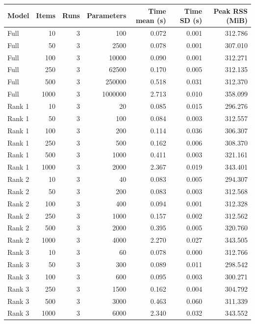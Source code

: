 \begin{tabular}{lrrrrrr}
\toprule
Model & Items & Runs & Parameters & Time mean (s) & Time SD (s) & Peak RSS (MiB) \\
\midrule
Full & 10 & 3 & 100 & 0.072 & 0.001 & 312.786 \\
Full & 50 & 3 & 2500 & 0.078 & 0.001 & 307.010 \\
Full & 100 & 3 & 10000 & 0.090 & 0.001 & 312.271 \\
Full & 250 & 3 & 62500 & 0.170 & 0.005 & 312.135 \\
Full & 500 & 3 & 250000 & 0.518 & 0.031 & 312.370 \\
Full & 1000 & 3 & 1000000 & 2.713 & 0.010 & 358.099 \\
Rank 1 & 10 & 3 & 20 & 0.085 & 0.015 & 296.276 \\
Rank 1 & 50 & 3 & 100 & 0.084 & 0.003 & 312.557 \\
Rank 1 & 100 & 3 & 200 & 0.114 & 0.036 & 306.307 \\
Rank 1 & 250 & 3 & 500 & 0.162 & 0.006 & 308.370 \\
Rank 1 & 500 & 3 & 1000 & 0.411 & 0.003 & 321.161 \\
Rank 1 & 1000 & 3 & 2000 & 2.367 & 0.019 & 343.401 \\
Rank 2 & 10 & 3 & 40 & 0.083 & 0.005 & 294.307 \\
Rank 2 & 50 & 3 & 200 & 0.083 & 0.003 & 312.568 \\
Rank 2 & 100 & 3 & 400 & 0.094 & 0.001 & 312.328 \\
Rank 2 & 250 & 3 & 1000 & 0.157 & 0.002 & 312.562 \\
Rank 2 & 500 & 3 & 2000 & 0.395 & 0.005 & 320.760 \\
Rank 2 & 1000 & 3 & 4000 & 2.270 & 0.027 & 343.505 \\
Rank 3 & 10 & 3 & 60 & 0.078 & 0.000 & 312.766 \\
Rank 3 & 50 & 3 & 300 & 0.089 & 0.011 & 298.542 \\
Rank 3 & 100 & 3 & 600 & 0.095 & 0.003 & 300.271 \\
Rank 3 & 250 & 3 & 1500 & 0.162 & 0.004 & 304.792 \\
Rank 3 & 500 & 3 & 3000 & 0.463 & 0.060 & 311.339 \\
Rank 3 & 1000 & 3 & 6000 & 2.340 & 0.032 & 343.552 \\
\bottomrule
\end{tabular}
